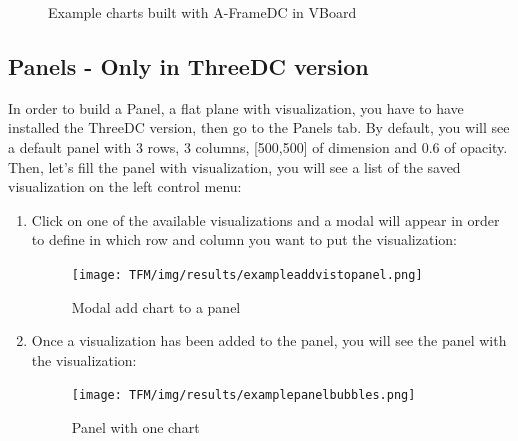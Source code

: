 \documentclass[a4paper, 12pt]{book}
\begin{document}
\begin{figure}[H]
 \centering
 \caption{Example charts built with A-FrameDC in VBoard}
 \label{f:threedcexamples}
\end{figure}

\subsection{Panels - Only in ThreeDC version}
In order to build a Panel, a flat plane with visualization, you have to have installed the ThreeDC version, then go to the Panels tab. By default, you will see a default panel with 3 rows, 3 columns, [500,500] of dimension and 0.6 of opacity. Then, let's fill the panel with visualization, you will see a list of the saved visualization on the left control menu:
\begin{enumerate}
    \item Click on one of the available visualizations and a modal will appear in order to define in which row and column you want to put the visualization:
    \begin{figure}[H]
      \centering
      \texttt{[image: TFM/img/results/exampleaddvistopanel.png]}
      \caption{Modal add chart to a panel}
      \label{fig:onlynodes}
    \end{figure}
    \item Once a visualization has been added to the panel, you will see the panel with the visualization:
    \begin{figure}[H]
      \centering
      \texttt{[image: TFM/img/results/examplepanelbubbles.png]}
      \caption{Panel with one chart}
      \label{fig:onlynodes}
    \end{figure}
\end{enumerate}
\end{document}
